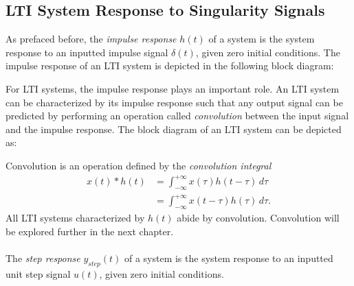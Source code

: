 \documentclass{report}
\begin{document}
\subsection{LTI System Response to Singularity Signals}
As prefaced before, the \emph{impulse response} $h(t)$ of a system is the system response to an inputted impulse signal $\delta(t)$, given zero initial conditions. 
The impulse response of an LTI system is depicted in the following block diagram:
\begin{center}
\end{center}
For LTI systems, the impulse response plays an important role. An LTI system can be characterized by its impulse response such that any output signal can be predicted by 
performing an operation called \emph{convolution} between the input signal and the impulse response. The block diagram of an LTI system can be depicted as:
\begin{center}
\end{center}
Convolution is an operation defined by the \emph{convolution integral}
\begin{align}
    x(t) * h(t) &= \int_{-\infty}^{+\infty} x(\tau)h(t-\tau) \,d\tau \\
    &= \int_{-\infty}^{+\infty} x(t-\tau)h(\tau) \,d\tau.
\end{align}
All LTI systems characterized by $h(t)$ abide by convolution. Convolution will be explored further in the next chapter.
\\ \\
The \emph{step response} $y_{step}(t)$ of a system is the system response to an inputted unit step signal $u(t)$, given zero initial conditions. 
\end{document}
